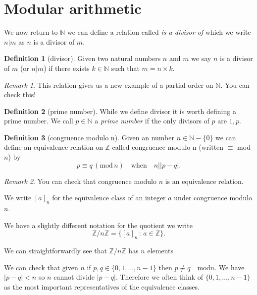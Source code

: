 \documentclass[
]{book}
\theoremstyle{definition}
\newtheorem{definition}{Definition}[chapter]
\theoremstyle{definition}
\theoremstyle{definition}
\theoremstyle{definition}
\theoremstyle{remark}
\newtheorem*{remark}{Remark}
\begin{document}
\section{Modular arithmetic}\label{modular-arithmetic}

We now return to \(\mathbb{N}\) we can define a relation called \emph{is a divisor of} which we write \(n|m\) as \(n\) is a divisor of \(m\).

\begin{definition}[divisor]
Given two natural numbers \(n\) and \(m\) we say \(n\) is a divisor of \(m\) (or \(n|m\)) if there exists \(k \in \mathbb{N}\) such that \(m=n\times k\).
\end{definition}

\begin{remark}
This relation gives us a new example of a partial order on \(\mathbb{N}\). You can check this!
\end{remark}

\begin{definition}[prime number]
While we define divisor it is worth defining a prime number. We call \(p \in \mathbb{N}\) a \emph{prime number} if the only divisors of \(p\) are \(1, p\).
\end{definition}

\begin{definition}[congruence modulo n]
Given an number \(n \in \mathbb{N}-\{0\}\) we can define an equivalence relation on \(\mathbb{Z}\) called congruence modulo n (written \(\equiv\) mod \(n\)) by
\[ p \equiv   q \, (\mbox{mod} \, n) \quad \mbox{when} \quad n\Big| |p-q|.   \]
\end{definition}

\begin{remark}
You can check that congruence modulo \(n\) is an equivalence relation.

We write \([a]_n\) for the equivalence class of an integer \(a\) under congruence modulo \(n\).

We have a slightly different notation for the quotient we write
\[ \mathbb{Z}/n\mathbb{Z} = \{ [a]_n \,:\, a \in \mathbb{Z}\}.  \]

We can straightforwardly see that \(\mathbb{Z}/n\mathbb{Z}\) has \(n\) elements
\end{remark}

We can check that given \(n\) if \(p,q \in \{0,1, \dots, n-1\}\) then \(p \not\equiv q \quad \mbox{mod} n\). We have \(|p-q| < n\) so \(n\) cannot divide \(|p-q|\). Therefore we often think of \(\{0, 1, \dots, n-1\}\) as the most important representatives of the equivalence classes.
\end{document}
